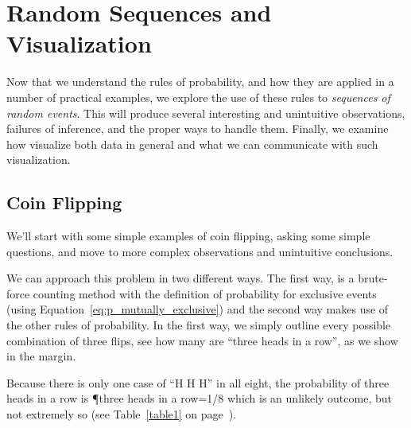 \chapter{Random Sequences and Visualization}\label{ch:randomseq}

Now that we understand the rules of probability, and how they are applied in a number of practical examples, we explore the use of these rules to \emph{sequences of random events}.  This will produce several interesting and unintuitive observations, failures of inference, and the proper ways to handle them.  Finally, we examine how visualize both data in general and what we can communicate with such visualization.

\section{Coin Flipping}

We'll start with some simple examples of coin flipping, asking some simple questions, and move to more complex observations and unintuitive conclusions.


We can approach this problem in two different ways.  The first way, is a brute-force counting method with the definition of probability for exclusive events (using Equation~\ref{eq:p_mutually_exclusive}) and the second way makes use of the other rules of probability.  
In the first way, we simply outline every possible combination of three flips, see how many are ``three heads in a row'', as we show in the margin.


Because there is only one case of ``H H H'' in all eight, the probability of three heads in a row is
\beqn
\P{three heads in a row}=1/8
\eeqn
which is an unlikely outcome, but not extremely so (see Table~\ref{table1} on page~\pageref{table1}).


